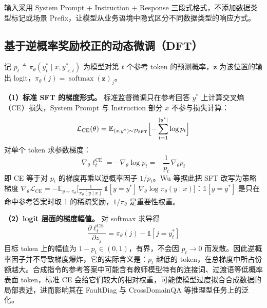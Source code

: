 \documentclass[fontset=fandol,type=master,campus=shenzhen,etitleauto=true]{hithesisbook}
\begin{document}
输入采用 System Prompt + Instruction + Response 三段式格式，不添加数据类型标记或场景 Prefix，让模型从业务语境中隐式区分不同数据类型的响应方式。

\subsection{基于逆概率奖励校正的动态微调（DFT）}\label{ux8badux7ec3ux914dux7f6eux4e0eux4f18ux5316}

记 $p_t \triangleq \pi_\theta(y_t^* \mid x, y_{<t}^*)$ 为模型对第 $t$ 个参考 token 的预测概率，$\mathbf{z}$ 为该位置的输出 logit，$\pi_\theta(j) = \operatorname{softmax}(\mathbf{z})_j$。

\textbf{（1）标准 SFT 的梯度形式。} 标准监督微调只在参考回答 $y^*$ 上计算交叉熵（CE）损失，System Prompt 与 Instruction 部分 $x$ 不参与损失计算：
\begin{equation}
\mathcal{L}_{\text{CE}}(\theta) = \mathbb{E}_{(x, y^*) \sim \mathcal{D}_{\text{SFT}}} \Bigl[ -\sum_{t=1}^{|y^*|} \log p_t \Bigr]
\end{equation}
对单个 token 求参数梯度：
\begin{equation}\label{eq:ce-grad}
\nabla_\theta \ell_t^{\text{CE}} = -\nabla_\theta \log p_t = -\frac{1}{p_t}\,\nabla_\theta p_t
\end{equation}
即 CE 等于对 $p_t$ 的梯度再乘以逆概率因子 $1/p_t$。Wu 等\cite{ref82}据此把 SFT 改写为策略梯度 $\nabla_\theta \mathcal{L}_{\text{CE}} = -\mathbb{E}_{y \sim \pi_\theta}\bigl[\tfrac{1}{\pi_\theta(y \mid x)}\,\mathbb{1}[y = y^*]\,\nabla_\theta \log \pi_\theta(y \mid x)\bigr]$：$\mathbb{1}[y = y^*]$ 是只在命中参考答案时取 1 的稀疏奖励，$1/\pi_\theta$ 是重要性权重。

\textbf{（2）logit 层面的梯度幅值。} 对 softmax 求导得
\begin{equation}\label{eq:ce-logit}
\frac{\partial \ell_t^{\text{CE}}}{\partial z_j} = \pi_\theta(j) - \mathbb{1}[j = y_t^*]
\end{equation}
目标 token 上的幅值为 $1 - p_t \in (0, 1)$，有界，不会因 $p_t \to 0$ 而发散。因此逆概率因子并不导致梯度爆炸，它的实际含义是：$p_t$ 越低的 token，在总梯度中所占份额越大。合成指令的参考答案中可能含有教师模型特有的连接词、过渡语等低概率表面 token，标准 CE 会给它们较大的相对权重，可能使模型过度拟合合成数据的局部表述，进而影响其在 FaultDiag 与 CrossDomainQA 等推理型任务上的泛化。
\end{document}
